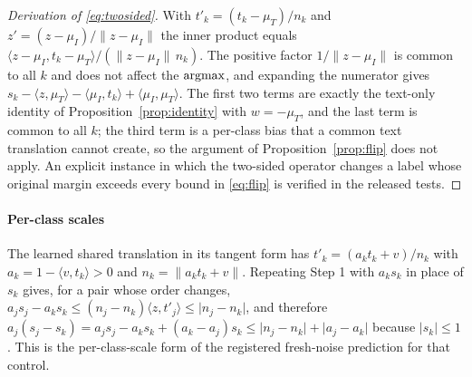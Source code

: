 \begin{proof}[Derivation of \eqref{eq:twosided}]
With $t'_k=(t_k-\mu_T)/n_k$ and $z'=(z-\mu_I)/\lVert z-\mu_I\rVert$ the inner
product equals $\langle z-\mu_I,t_k-\mu_T\rangle/(\lVert z-\mu_I\rVert\,n_k)$.
The positive factor $1/\lVert z-\mu_I\rVert$ is common to all $k$ and does not
affect the $\operatorname{argmax}$, and expanding the numerator gives
$s_k-\langle z,\mu_T\rangle-\langle\mu_I,t_k\rangle+\langle\mu_I,\mu_T\rangle$.
The first two terms are exactly the text-only identity of
Proposition~\ref{prop:identity} with $w=-\mu_T$, and the last term is common to
all $k$; the third term is a per-class bias that a common text translation
cannot create, so the argument of Proposition~\ref{prop:flip} does not apply.
An explicit instance in which the two-sided operator changes a label whose
original margin exceeds every bound in \eqref{eq:flip} is verified in the
released tests.
\end{proof}

\paragraph{Per-class scales}
The learned shared translation in its tangent form has $t'_k=(a_kt_k+v)/n_k$ with
$a_k=1-\langle v,t_k\rangle>0$ and $n_k=\lVert a_kt_k+v\rVert$. Repeating
Step 1 with $a_ks_k$ in place of $s_k$ gives, for a pair whose order changes,
$a_js_j-a_ks_k\le(n_j-n_k)\langle z,t'_j\rangle\le\lvert n_j-n_k\rvert$, and
therefore
$a_j(s_j-s_k)=a_js_j-a_ks_k+(a_k-a_j)s_k\le\lvert n_j-n_k\rvert+\lvert a_j-a_k\rvert$
because $\lvert s_k\rvert\le1$. This is the per-class-scale form of the
registered fresh-noise prediction for that control.
